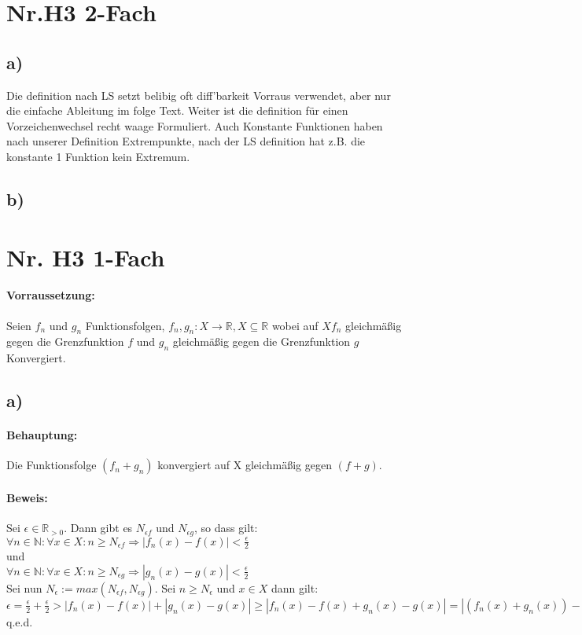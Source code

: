 \section*{Nr.H3 2-Fach}

\subsection*{a)}

Die definition nach LS setzt belibig oft diff'barkeit Vorraus verwendet,
aber nur die einfache Ableitung im folge Text.
Weiter ist die definition für einen Vorzeichenwechsel recht waage Formuliert.
Auch Konstante Funktionen haben nach unserer Definition Extrempunkte, nach der LS definition
hat z.B. die konstante 1 Funktion kein Extremum.


\subsection*{b)}

\section*{Nr. H3 1-Fach}

\paragraph*{Vorraussetzung:} Seien $f_{n}$ und $g_{n}$ Funktionsfolgen, $f_{n}, g_{n} : X \rightarrow \mathbb{R}, X \subseteq \mathbb{R}$ wobei auf $X f_{n}$ gleichmäßig gegen die Grenzfunktion $f$ und $g_{n}$ gleichmäßig gegen die Grenzfunktion $g$ Konvergiert.

\subsection*{a)}

\paragraph*{Behauptung:} Die Funktionsfolge $(f_{n}+g_{n})$ konvergiert auf X gleichmäßig gegen $(f+g)$.

\paragraph*{Beweis:} Sei $\epsilon \in \mathbb{R}_{>0}$. Dann gibt es $N_{\epsilon f}$ und $N_{\epsilon g}$, so dass gilt: \\
$\forall n \in \mathbb{N} :\forall x \in X: n \geq N_{\epsilon f} \Rightarrow |f_{n}(x)-f(x)| < \frac{\epsilon} {2}$\\
und \\
$\forall n \in \mathbb{N} :\forall x \in X: n \geq N_{\epsilon g} \Rightarrow |g_{n}(x)-g(x)| < \frac{\epsilon} {2}$ \\
Sei nun  $N_{\epsilon} := max(N_{\epsilon f}, N_{\epsilon g})$. Sei $n \geq N_{\epsilon}$ und $x \in X$ dann gilt: \\
$\epsilon = \frac{\epsilon} {2}+\frac{\epsilon} {2} > |f_{n}(x)-f(x)|+|g_{n}(x)-g(x)| \geq |f_{n}(x)-f(x)+g_{n}(x)-g(x)| = |(f_{n}(x)+g_{n}(x))-(f(x)+g(x))|$\\
q.e.d.

